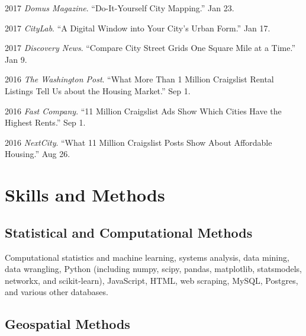 \documentclass[12pt,letterpaper]{report}
\newcommand{\listitemspace}{0.15em}
\renewenvironment{itemize}
{\begin{list}{}{\setlength{\leftmargin}{0em}
			\setlength{\parskip}{0em}
			\setlength{\itemsep}{\listitemspace}
			\setlength{\parsep}{\listitemspace}}}
	{\end{list}}
\begin{document}
\begin{tablist}
		\item 2017 \tab \textit{Domus Magazine}. \enquote{Do-It-Yourself City Mapping.} Jan 23.
		
		\item 2017 \tab \textit{CityLab}. \enquote{A Digital Window into Your City's Urban Form.} Jan 17.
		
		\item 2017 \tab \textit{Discovery News}. \enquote{Compare City Street Grids One Square Mile at a Time.} Jan 9.
		
		\item 2016 \tab \textit{The Washington Post}. \enquote{What More Than 1 Million Craigslist Rental Listings Tell Us about the Housing Market.} Sep 1.
		
		\item 2016 \tab \textit{Fast Company}. \enquote{11 Million Craigslist Ads Show Which Cities Have the Highest Rents.} Sep 1.
		
		\item 2016 \tab \textit{NextCity}. \enquote{What 11 Million Craigslist Posts Show About Affordable Housing.} Aug 26.
		
	\end{tablist}
	
	
	
	\section*{Skills and Methods}
	
	\subsection*{Statistical and Computational Methods}
	
	\begin{itemize}
		
		\item Computational statistics and machine learning, systems analysis, data mining, data wrangling, Python (including numpy, scipy, pandas, matplotlib, statsmodels, networkx, and scikit-learn), JavaScript, HTML, web scraping, MySQL, Postgres, and various other databases.
		
	\end{itemize}
	
	\subsection*{Geospatial Methods}
	
\end{document}
